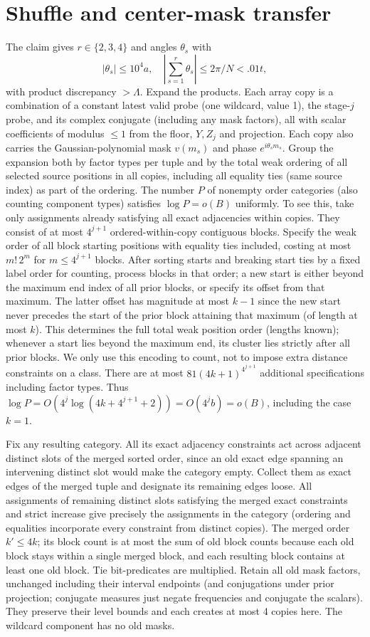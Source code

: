 \documentclass[11pt]{article}
\begin{document}
\section*{Shuffle and center-mask transfer} The claim gives \(r\in\{2,3,4\}\) and angles \(\theta_s\) with
\[
 |\theta_s|\le10^4 a,\quad |\sum_{s=1}^r\theta_s|\le2\pi/N<.01t,
\]
with product discrepancy \(>\Lambda\). Expand the products. Each array copy is a combination of a constant latest valid probe (one wildcard, value 1), the stage-\(j\) probe, and its complex conjugate (including any mask factors), all with scalar coefficients of modulus \(\le1\) from the floor, \(Y,Z_j\) and projection. Each copy also carries the Gaussian-polynomial mask \(v(m_s)\) and phase \(e^{i\theta_s m_s}\). Group the expansion both by factor types per tuple and by the total weak ordering of all selected source positions in all copies, including all equality ties (same source index) as part of the ordering. The number \(P\) of nonempty order categories (also counting component types) satisfies \(\log P=o(B)\) uniformly. To see this, take only assignments already satisfying all exact adjacencies within copies. They consist of at most \(4^{j+1}\) ordered-within-copy contiguous blocks. Specify the weak order of all block starting positions with equality ties included, costing at most \(m!\,2^m\) for \(m\le4^{j+1}\) blocks. After sorting starts and breaking start ties by a fixed label order for counting, process blocks in that order; a new start is either beyond the maximum end index of all prior blocks, or specify its offset from that maximum. The latter offset has magnitude at most \(k-1\) since the new start never precedes the start of the prior block attaining that maximum (of length at most \(k\)). This determines the full total weak position order (lengths known); whenever a start lies beyond the maximum end, its cluster lies strictly after all prior blocks. We only use this encoding to count, not to impose extra distance constraints on a class. There are at most \(81(4k+1)^{4^{j+1}}\) additional specifications including factor types. Thus \(\log P=O(4^j\log(4k+4^{j+1}+2))=O(4^j b)=o(B)\), including the case \(k=1\).

Fix any resulting category. All its exact adjacency constraints act across adjacent distinct slots of the merged sorted order, since an old exact edge spanning an intervening distinct slot would make the category empty. Collect them as exact edges of the merged tuple and designate its remaining edges loose. All assignments of remaining distinct slots satisfying the merged exact constraints and strict increase give precisely the assignments in the category (ordering and equalities incorporate every constraint from distinct copies). The merged order \(k'\le4k\); its block count is at most the sum of old block counts because each old block stays within a single merged block, and each resulting block contains at least one old block. Tie bit-predicates are multiplied. Retain all old mask factors, unchanged including their interval endpoints (and conjugations under prior projection; conjugate measures just negate frequencies and conjugate the scalars). They preserve their level bounds and each creates at most 4 copies here. The wildcard component has no old masks.
\end{document}
